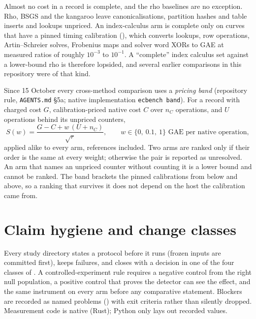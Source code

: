 Almost no cost in a record is complete, and the rho baselines are no
exception. Rho, BSGS and the kangaroo leave canonicalisations, partition
hashes and table inserts and lookups unpriced. An index-calculus arm is
complete only on curves that have a pinned timing calibration
(), which converts lookups, row operations,
Artin--Schreier solves, Frobenius maps and solver word XORs to GAE at
measured ratios of roughly $10^{-3}$ to $10^{-1}$. A ``complete'' index
calculus set against a lower-bound rho is therefore lopsided, and several
earlier comparisons in this repository were of that kind.

Since 15 October every cross-method comparison uses a \emph{pricing band}
(repository rule, \texttt{AGENTS.md} \S5a; native implementation
\texttt{ecbench band}). For a record with charged cost $G$, calibration-priced
native cost $C$ over $n_C$ operations, and $U$ operations behind its
unpriced counters,
\[
  S(w)=\frac{G-C+w\,(U+n_C)}{\sqrt r},\qquad w\in\{0,\ 0.1,\ 1\}
  \text{ GAE per native operation},
\]
applied alike to every arm, references included. Two arms are ranked only
if their order is the same at every weight; otherwise the pair is reported
as unresolved. An arm that names an unpriced counter without counting it is
a lower bound and cannot be ranked. The band brackets the pinned
calibrations from below and above, so a ranking that survives it does not
depend on the host the calibration came from.

\section{Claim hygiene and change classes}

Every study directory states a protocol before it runs (frozen inputs are
committed first), keeps failures, and closes with a decision in one of the
four classes of \cite{icprogram2026}. A controlled-experiment rule requires a
negative control from the right null population, a positive control that
proves the detector can see the effect, and the same instrument on every
arm before any comparative statement. Blockers are recorded as named
problems () with exit criteria rather than silently dropped.
Measurement code is native (Rust); Python only lays out recorded values.

\begin{table}[tbp]
\centering\footnotesize

\caption[]{Standing of the programme's records at \texttt{origin/main}
\texttt{05f73826}, 6 November 2026. ``Running'' sessions were never
finalised (a runner killed outright); \texttt{ecbench verify} audits them
as interrupted. The \texttt{pcc} ledger began on 4 November and holds no
verdict entry, so no claim record has a standing beyond ``unverified''.
Counts by ; table by
.}
\label{tab:fm-standing}
\end{table}

